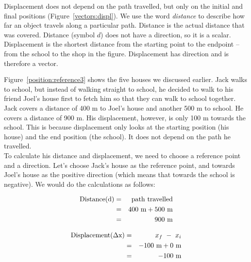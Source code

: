 Displacement does not depend on the path travelled, but only on the initial and final positions (Figure~\ref{vectors:displ}). We use the word \textit{distance} to describe how far an object travels along a particular path. Distance is the actual distance that was covered. Distance (symbol $d$) does not have a direction, so it is a scalar. Displacement is the shortest distance from the starting point to the endpoint -- from the school to the shop in the figure. Displacement has direction and is therefore a vector.

Figure~\ref{position:reference3} shows the five houses we discussed earlier. Jack walks to school, but instead of walking straight to school, he decided to walk to his friend Joel's house first to fetch him so that they can walk to school together. Jack covers a distance of 400 m to Joel's house and another 500 m to school. He covers a distance of 900 m. His displacement, however, is only 100 m towards the school. This is because displacement only looks at the starting position (his house) and the end position (the school). It does not depend on the path he travelled. \\

To calculate his distance and displacement, we need to choose a reference point and a direction. Let's choose Jack's house as the reference point, and towards Joel's house as the positive direction (which means that towards the school is negative). We would do the calculations as follows:\\

\begin{minipage}{0.5\textwidth}
\begin{eqnarray*}
\rm{Distance (d)} &=& \rm{path~travelled}\\
&=&400\ \mathrm{m} + 500\ \mathrm{m}\\
&=&900\ \mathrm{m}\\
\end{eqnarray*}
\end{minipage}
\begin{minipage}{0.5\textwidth}
\begin{eqnarray*}
\rm{Displacement} (\Delta x) &=& x_f~ - ~ x_i\\
&=&-100\ \mathrm{m} + 0\ \mathrm{m}\\
&=&-100\ \mathrm{m}\\
\end{eqnarray*}
\end{minipage}

